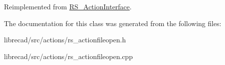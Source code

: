 Reimplemented from \hyperlink{classRS__ActionInterface_aa2ba8f6f697f735eace4ec5449c0b8cd}{R\-S\-\_\-\-Action\-Interface}.



The documentation for this class was generated from the following files\-:\begin{DoxyCompactItemize}
\item 
librecad/src/actions/rs\-\_\-actionfileopen.\-h\item 
librecad/src/actions/rs\-\_\-actionfileopen.\-cpp\end{DoxyCompactItemize}
